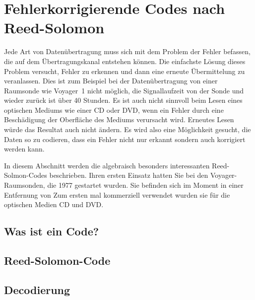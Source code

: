 %
%
%
\section{Fehlerkorrigierende Codes nach Reed-Solomon
\label{buch:section:reed-solomon}}
Jede Art von Datenübertragung muss sich mit dem Problem der Fehler befassen,
die auf dem Übertragungskanal entstehen können.
Die einfachste Lösung dieses Problem versucht, Fehler zu erkennen und 
dann eine erneute Übermittelung zu veranlassen.
Dies ist zum Beispiel bei der Datenübertragung von einer Raumsonde
wie Voyager~1 nicht möglich, die Signallaufzeit von der Sonde und wieder
zurück ist über 40 Stunden.
Es ist auch nicht sinnvoll beim Lesen eines optischen Mediums wie einer
CD oder DVD, wenn ein Fehler durch eine Beschädigung der Oberfläche
des Mediums verursacht wird.
Erneutes Lesen würde das Resultat auch nicht ändern.
Es wird also eine Möglichkeit gesucht, die Daten so zu codieren, dass
ein Fehler nicht nur erkannt sondern auch korrigiert werden kann.

In diesem Abschnitt werden die algebraisch besonders interessanten
Reed-Solmon-Codes beschrieben.
Ihren ersten Einsatz hatten Sie bei den Voyager-Raumsonden, die 1977
gestartet wurden.
Sie befinden sich im Moment in einer Entfernung von 
Zum ersten mal kommerziell verwendet wurden sie für die optischen
Medien CD und DVD.


\subsection{Was ist ein Code?
\label{buch:subsection:was-ist-ein-code}}

\subsection{Reed-Solomon-Code
\label{buch:subsection:reed-solomon-code}}

\subsection{Decodierung
\label{buch:subsection:decodierung}}
